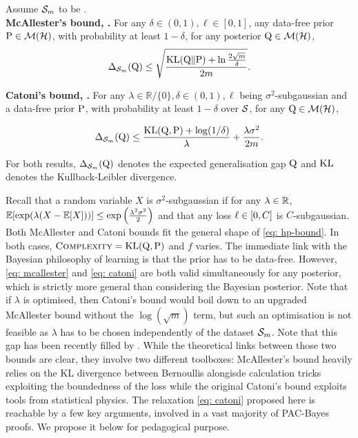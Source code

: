     \begin{proposition}
        \label{prop: mcall-catoni}
        Assume $\Sm$ to be \iid.\\
    \textbf{McAllester's bound, \citep[Theorem 5]{maurer2004note}.}  For any $\delta\in(0,1),\ell\in[0,1]$, any data-free prior $\P\in\Mcal(\Hcal)$, with probability at least $1-\delta$, for any posterior $\Q\in\Mcal(\H)$,
    \begin{align}
    \label{eq: mcallester}
     \Delta_{\Sm}(\Q) \le \sqrt{\frac{\KL(\Q\|\P) + \ln{\frac{2\sqrt{m}}{\delta}}}{2m}}.
    \end{align}

    \textbf{Catoni's bound, \citep[Theorem 4.1]{alquier2016properties}.}
    For any $\lambda\in\mathbb{R}/\{0\},\delta\in(0,1),\ell$ being $\sigma^2$-subgaussian and a data-free prior $\P$, with probability at least $1-\delta$ over $\S$, for any $\Q\in \Mcal(\Hcal)$,

  \begin{align}
    \label{eq: catoni}
    \Delta_{\Sm}(\Q) \leq  \frac{\KL(\Q,\P) + \log(1/\delta)}{\lambda} + \frac{\lambda\sigma^2}{2m}.  
  \end{align}

    For both results, $\Delta_{\Sm}(\Q)$ denotes the expected generalisation gap \wrt $\Q$ and $\KL$ denotes the Kullback-Leibler divergence.
    \end{proposition}

Recall that a random variable $X$ is $\sigma^2$-subgaussian if for any $\lambda\in\Rbb$, $\Ebb[\exp(\lambda(X-\Ebb[X]))] \leq \exp\LP \frac{\lambda^2 \sigma^2}{2} \RP$ and that any loss $\loss\in[0,C]$ is $C$-subgaussian. Both McAllester and Catoni bounds fit the general shape of \eqref{eq: hp-bound}. In both cases, $\textsc{Complexity}= \KL(\Q,\P)$ and $f$ varies. The immediate link with the Bayesian philosophy of learning is that the prior has to be data-free. However, \eqref{eq: mcallester} and \eqref{eq: catoni} are both valid simultaneously for any posterior, which is strictly more general than considering the Bayesian posterior. Note that if $\lambda$ is optimised, then Catoni's bound would boil down to an upgraded McAllester bound without the $\log(\sqrt{m})$ term, but such an optimisation is not feasible as $\lambda$ has to be chosen independently of the dataset $\Sm$. 
Note that this gap has been recently filled by \citet[Theorem 33]{dupuis2024generalization}. While the theoretical links between those two bounds are clear, they involve two different toolboxes: McAllester's bound heavily relies on the KL divergence between Bernoullis alongisde calculation tricks exploiting the boundedness of the loss while the original Catoni's bound \citep[Theorem 1.2.6]{catoni2007pac} exploits tools from statistical physics. 
The relaxation \eqref{eq: catoni} proposed here is reachable by a few key arguments, involved in a vast majority of PAC-Bayes proofs. We propose it below for pedagogical purpose. 

